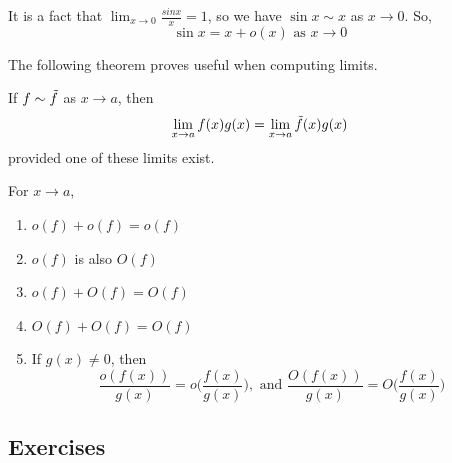   \begin{example}
    \label{ex:asymptotic-equivalence-of-sinx-and-x}
    It is a fact that $\lim_{x\to 0} \frac{sin{x}}{x} = 1$, so we have $\sin{x} \sim x$ as $x \to 0$. So,
    \begin{equation}
      \sin{x} = x + o(x) \text{ as } x \to 0
    \end{equation}
  \end{example}

  The following theorem proves useful when computing limits. 

  \begin{theorem}
    \label{thm:substituting-asymptotic-equivalents-in-a-limit}
    If $f \sim \Tilde{f}$ as $x \to a$, then 
    \begin{equation}
      \lim_{x \to a} f(x) g(x) = \lim_{x \to a} \Tilde{f}(x) g(x)
    \end{equation}
    provided one of these limits exist. 
  \end{theorem}

  \begin{theorem}
    \label{thm:properties-of-og-and-og-functions}
    For $x \to a$, 
    \begin{enumerate}
      \item $o(f) + o(f) = o(f)$
      \item $o(f)$ is also $O(f)$
      \item $o(f) + O(f) = O(f)$
      \item $O(f) + O(f) = O(f)$
      \item If $g(x) \neq 0$, then 
      \begin{equation}
        \frac{o(f(x))}{g(x)} = o \bigg( \frac{f(x)}{g(x)} \bigg), \text{ and } \frac{O(f(x))}{g(x)} = O \bigg( \frac{f(x)}{g(x)} \bigg)
      \end{equation}
    \end{enumerate}
  \end{theorem}

\subsection{Exercises}


